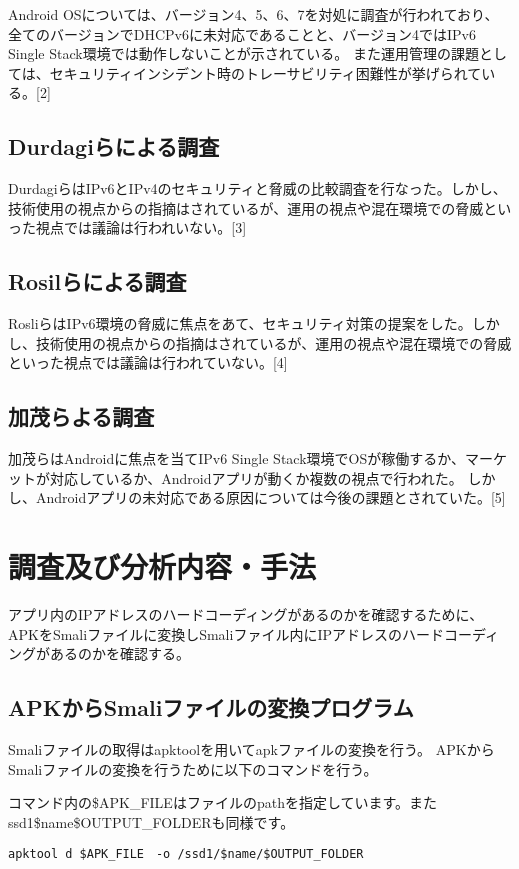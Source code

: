 \documentclass[a4j]{jarticle}
\begin{document}
Android OSについては、バージョン4、5、6、7を対処に調査が行われており、全てのバージョンでDHCPv6に未対応であることと、バージョン4ではIPv6 Single Stack環境では動作しないことが示されている。
また運用管理の課題としては、セキュリティインシデント時のトレーサビリティ困難性が挙げられている。[2]
\subsection{Durdagiらによる調査}
DurdagiらはIPv6とIPv4のセキュリティと脅威の比較調査を行なった。しかし、技術使用の視点からの指摘はされているが、運用の視点や混在環境での脅威といった視点では議論は行われいない。[3]

\subsection{Rosilらによる調査}
RosliらはIPv6環境の脅威に焦点をあて、セキュリティ対策の提案をした。しかし、技術使用の視点からの指摘はされているが、運用の視点や混在環境での脅威といった視点では議論は行われていない。[4]


\subsection{加茂らよる調査}
加茂らはAndroidに焦点を当てIPv6 Single Stack環境でOSが稼働するか、マーケットが対応しているか、Androidアプリが動くか複数の視点で行われた。
しかし、Androidアプリの未対応である原因については今後の課題とされていた。[5]	

\newpage
\section{調査及び分析内容・手法}
アプリ内のIPアドレスのハードコーディングがあるのかを確認するために、APKをSmaliファイルに変換しSmaliファイル内にIPアドレスのハードコーディングがあるのかを確認する。
\subsection{APKからSmaliファイルの変換プログラム}
Smaliファイルの取得はapktoolを用いてapkファイルの変換を行う。
APKからSmaliファイルの変換を行うために以下のコマンドを行う。

コマンド内の\$APK\_FILEはファイルのpathを指定しています。また\/ssd1\/\$name\/\$OUTPUT\_FOLDERも同様です。

\begin{lstlisting}[caption=APKからSmaliファイルの変換のコマンド]
	apktool d $APK_FILE　-o /ssd1/$name/$OUTPUT_FOLDER
\end{lstlisting}
\end{document}
